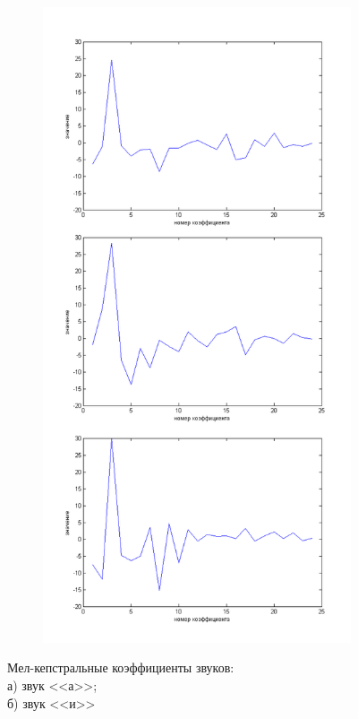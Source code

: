 \documentclass[a4paper,14pt,russian,utf8,nocolumnsxix,nocolumnxxxi,nocolumnxxxii]{eskdtext}
\begin{document}
\begin{figure}[!ht]
\begin{subfigure}{0.49\textwidth}
	\caption{}
	\label{a_mfcc}
	\end{subfigure}
	\begin{subfigure}{0.49\textwidth}
	\centering
	\includegraphics[width=.99\textwidth]{i_mfcc.png}
	\caption{}	
	\label{i_mfcc}
	\end{subfigure}
	\caption{Мел-кепстральные коэффициенты звуков: \\ а) звук <<а>>; \\ б) звук <<и>>}
	\label{sounds_mfcc}
\end{figure}
\end{document}
